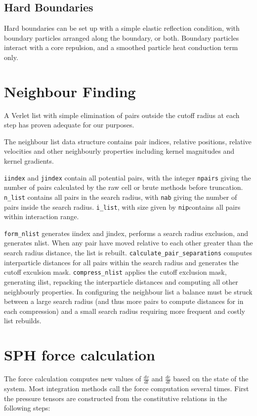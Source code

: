 \subsection{Hard Boundaries}
Hard boundaries can be set up with a simple elastic reflection condition, with
boundary particles arranged along the boundary, or both. Boundary particles
interact with a core repulsion, and a smoothed particle heat conduction term
only.

\section{Neighbour Finding}
A Verlet list with simple elimination of pairs outside the cutoff radius at
each step has proven adequate for our purposes.

The neighbour list data structure contains pair indices, relative positions,
relative velocities and other neighbourly properties including kernel
magnitudes and kernel gradients.

\texttt{iindex} and \texttt{jindex} contain all potential pairs, with the
integer \texttt{npairs} giving the number of pairs calculated by the raw cell
or brute methods before truncation. \texttt{n\_list} contains all pairs in the
search radius, with \texttt{nab} giving the number of pairs inside the search
radius. \texttt{i\_list}, with size given by \texttt{nip}contains all pairs
within interaction range. 

\texttt{form\_nlist} generates iindex and jindex, performs a search radius
exclusion, and generates nlist. When any pair have moved relative to each other
greater than the search radius distance, the list is rebuilt.
\texttt{calculate\_pair\_separations} computes interparticle distances for all
pairs within the search radius and generates the cutoff exculsion mask.
\texttt{compress\_nlist} applies the cutoff exclusion mask, generating ilist,
repacking the interparticle distances and computing all other neighbourly
properties. In configuring the neighbour list a balance must be struck between
a large search radius (and thus more pairs to compute distances for in each
compression) and a small search radius requiring more frequent and costly list
rebuilds.
	
\section{SPH force calculation}
The force calculation computes new values of $\frac{dv}{dt}$ and
$\frac{de}{dt}$ based on the state of the system. Most integration methods call
the force computation several times.  First the pressure tensors are
constructed from the constitutive relations in the following steps:


